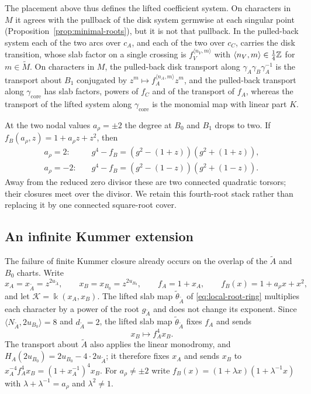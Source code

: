 The placement above thus defines the lifted coefficient system.  On
characters in $M$ it agrees with the pullback of the disk system germwise at
each singular point (Proposition~\ref{prop:minimal-roots}), but it is not
that pullback.  In the pulled-back system each of the two arcs over $c_A$,
and each of the two over $c_C$, carries the disk transition, whose slab
factor on a single crossing is $f_V^{\langle n_V,m\rangle}$ with
$\langle n_V,m\rangle\in\frac14\mathbb Z$ for $m\in\widetilde M$.  On characters in
$M$, the pulled-back disk transport along $\gamma_A\gamma_B\gamma_A^{-1}$ is
the transport about $B_1$ conjugated by
$z^m\mapsto f_A^{\langle n_A,m\rangle}z^m$, and the pulled-back transport
along $\gamma_{\mathrm{core}}$ has slab factors, powers of $f_C$ and of the
transport of $f_A$, whereas the transport of the lifted system along
$\gamma_{\mathrm{core}}$ is the monomial map with linear part $K$.

At the two nodal values $a_\rho=\pm2$ the degree at $B_0$ and $B_1$ drops to two.  If
$f_B(a_\rho,z)=1+a_\rho z+z^2$, then
\begin{equation}\label{eq:cusp-roots}
\begin{aligned}
 a_\rho=2:&\quad g^4-f_B=(g^2-(1+z))(g^2+(1+z)),\\
 a_\rho=-2:&\quad g^4-f_B=(g^2-(1-z))(g^2+(1-z)).
\end{aligned}
\end{equation}
Away from the reduced zero divisor these are two connected quadratic
torsors; their closures meet over the divisor.  We retain this fourth-root
stack rather than replacing it by one connected square-root cover.

\subsection{An infinite Kummer extension}
\label{subsec:root-orbit}

The failure of finite Kummer closure already occurs on the overlap of the
$\widetilde A$ and $B_0$ charts.  Write
\[
 x_A=x_{\widetilde A}=z^{2u_{\widetilde A}},\qquad
 x_B=x_{B_0}=z^{2u_{B_0}},\qquad f_A=1+x_A,\qquad
 f_B(x)=1+a_\rho x+x^2,
\]
and let $\mathcal K=\Bbbk(x_A,x_B)$.  The lifted slab map
$\widetilde\theta_{\widetilde A}$ of \eqref{eq:local-root-ring} multiplies
each character by a power of the root $g_{\widetilde A}$ and does not change
its exponent.  Since
$\langle N_{\widetilde A},2u_{B_0}\rangle=8$ and $d_{\widetilde A}=2$, the
lifted slab map $\widetilde\theta_{\widetilde A}$ fixes $f_A$ and sends
\begin{equation}\label{eq:shear}
 x_B\longmapsto f_A^4x_B.
\end{equation}
The transport about $\widetilde A$ also applies the linear monodromy, and
$H_A(2u_{B_0})=2u_{B_0}-4\cdot2u_{\widetilde A}$; it therefore fixes $x_A$
and sends $x_B$ to $x_A^{-4}f_A^4x_B=(1+x_A^{-1})^4x_B$.  For $a_\rho\neq\pm2$
write $f_B(x)=(1+\lambda x)(1+\lambda^{-1}x)$ with $\lambda+\lambda^{-1}=a_\rho$
and $\lambda^2\neq1$.

